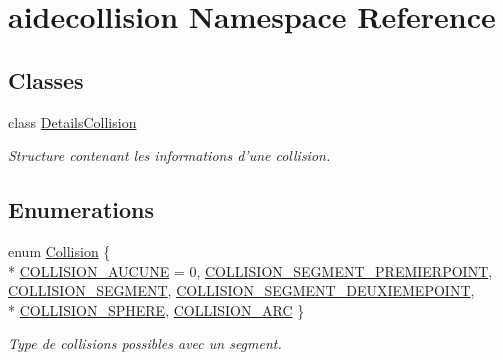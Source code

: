 \hypertarget{namespaceaidecollision}{\section{aidecollision Namespace Reference}
\label{namespaceaidecollision}
}
\subsection*{Classes}
\begin{DoxyCompactItemize}
\item 
class \hyperlink{classaidecollision_1_1_details_collision}{Details\-Collision}
\begin{DoxyCompactList}\small\item\em Structure contenant les informations d'une collision. \end{DoxyCompactList}\end{DoxyCompactItemize}
\subsection*{Enumerations}
\begin{DoxyCompactItemize}
\item 
enum \hyperlink{namespaceaidecollision_a1c8613e2393aa3268262f9d23d60c0c9}{Collision} \{ \\*
\hyperlink{namespaceaidecollision_a1c8613e2393aa3268262f9d23d60c0c9aaeca4c27e7f9fac0b4377434adbd023c}{C\-O\-L\-L\-I\-S\-I\-O\-N\-\_\-\-A\-U\-C\-U\-N\-E} = 0, 
\hyperlink{namespaceaidecollision_a1c8613e2393aa3268262f9d23d60c0c9a44ff1ddc6b0253e2004be538fae53ebe}{C\-O\-L\-L\-I\-S\-I\-O\-N\-\_\-\-S\-E\-G\-M\-E\-N\-T\-\_\-\-P\-R\-E\-M\-I\-E\-R\-P\-O\-I\-N\-T}, 
\hyperlink{namespaceaidecollision_a1c8613e2393aa3268262f9d23d60c0c9a09350bf25deeeaa23c3cad60c0850850}{C\-O\-L\-L\-I\-S\-I\-O\-N\-\_\-\-S\-E\-G\-M\-E\-N\-T}, 
\hyperlink{namespaceaidecollision_a1c8613e2393aa3268262f9d23d60c0c9a87f16ce06c2f991eec0f3256b88821a4}{C\-O\-L\-L\-I\-S\-I\-O\-N\-\_\-\-S\-E\-G\-M\-E\-N\-T\-\_\-\-D\-E\-U\-X\-I\-E\-M\-E\-P\-O\-I\-N\-T}, 
\\*
\hyperlink{namespaceaidecollision_a1c8613e2393aa3268262f9d23d60c0c9a3ef9ed849f1f30f340aeba05361ba374}{C\-O\-L\-L\-I\-S\-I\-O\-N\-\_\-\-S\-P\-H\-E\-R\-E}, 
\hyperlink{namespaceaidecollision_a1c8613e2393aa3268262f9d23d60c0c9ac9da4dfe3ea2d5f858ef63183a69834b}{C\-O\-L\-L\-I\-S\-I\-O\-N\-\_\-\-A\-R\-C}
 \}
\begin{DoxyCompactList}\small\item\em Type de collisions possibles avec un segment. \end{DoxyCompactList}\end{DoxyCompactItemize}
